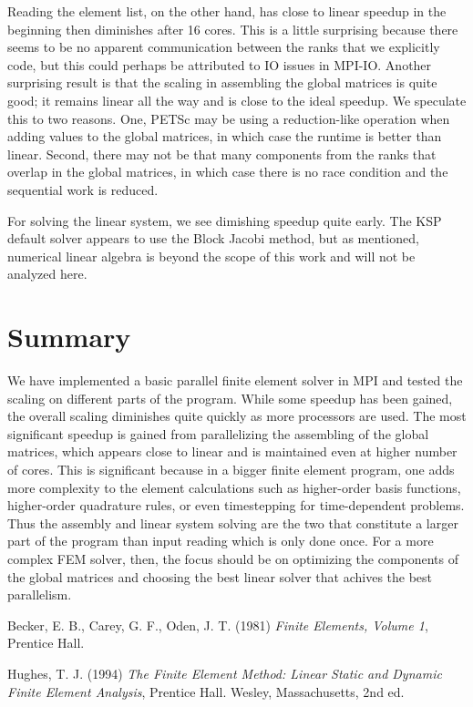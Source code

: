 \documentclass[12pt,notitlepage]{extreport}
\begin{document}
Reading the element list, on the other hand, has close to linear speedup in the beginning then diminishes after 16 cores. This is a little surprising because there seems to be no apparent communication between the ranks that we explicitly code, but this could perhaps be attributed to IO issues in MPI-IO. Another surprising result is that the scaling in assembling the global matrices is quite good; it remains linear all the way and is close to the ideal speedup. We speculate this to two reasons. One, PETSc may be using a reduction-like operation when adding values to the global matrices, in which case the runtime is better than linear. Second, there may not be that many components from the ranks that overlap in the global matrices, in which case there is no race condition and the sequential work is reduced.

For solving the linear system, we see dimishing speedup quite early. The KSP default solver appears to use the Block Jacobi method, but as mentioned, numerical linear algebra is beyond the scope of this work and will not be analyzed here.

\section*{Summary}
We have implemented a basic parallel finite element solver in MPI and tested the scaling on different parts of the program. While some speedup has been gained, the overall scaling diminishes quite quickly as more processors are used. The most significant speedup is gained from parallelizing the assembling of the global matrices, which appears close to linear and is maintained even at higher number of cores. This is significant because in a bigger finite element program, one adds more complexity to the element calculations such as higher-order basis functions, higher-order quadrature rules, or  even timestepping for time-dependent problems. Thus the assembly and linear system solving are the two that constitute a larger part of the program than input reading which is only done once. For a more complex FEM solver, then, the focus should be on optimizing the components of the global matrices and choosing the best linear solver that achives the best parallelism.

\begin{thebibliography}{3}
Becker, E. B., Carey, G. F., Oden, J. T. (1981) \emph{Finite Elements, Volume 1}, Prentice Hall.

Hughes, T. J. (1994) \emph{The Finite Element Method: Linear Static and Dynamic Finite Element Analysis}, Prentice Hall.
Wesley, Massachusetts, 2nd ed.
\end{thebibliography}
\end{document}
